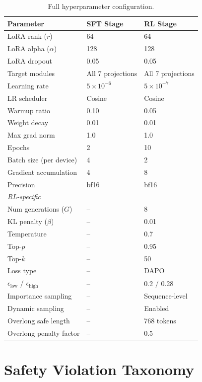 \documentclass{article}
\begin{document}
\begin{table}[h]
\centering
\caption{Full hyperparameter configuration.}
\label{tab:hyperparams}
\begin{tabular}{lll}
\toprule
\textbf{Parameter} & \textbf{SFT Stage} & \textbf{RL Stage} \\
\midrule
LoRA rank ($r$) & 64 & 64 \\
LoRA alpha ($\alpha$) & 128 & 128 \\
LoRA dropout & 0.05 & 0.05 \\
Target modules & All 7 projections & All 7 projections \\
Learning rate & $5 \times 10^{-6}$ & $5 \times 10^{-7}$ \\
LR scheduler & Cosine & Cosine \\
Warmup ratio & 0.10 & 0.05 \\
Weight decay & 0.01 & 0.01 \\
Max grad norm & 1.0 & 1.0 \\
Epochs & 2 & 10 \\
Batch size (per device) & 4 & 2 \\
Gradient accumulation & 4 & 8 \\
Precision & bf16 & bf16 \\
\midrule
\multicolumn{3}{l}{\emph{RL-specific}} \\
Num generations ($G$) & -- & 8 \\
KL penalty ($\beta$) & -- & 0.01 \\
Temperature & -- & 0.7 \\
Top-$p$ & -- & 0.95 \\
Top-$k$ & -- & 50 \\
Loss type & -- & DAPO \\
$\epsilon_{\text{low}}$ / $\epsilon_{\text{high}}$ & -- & 0.2 / 0.28 \\
Importance sampling & -- & Sequence-level \\
Dynamic sampling & -- & Enabled \\
Overlong safe length & -- & 768 tokens \\
Overlong penalty factor & -- & 0.5 \\
\bottomrule
\end{tabular}
\end{table}

\section{Safety Violation Taxonomy}
\label{app:safety}
\end{document}

